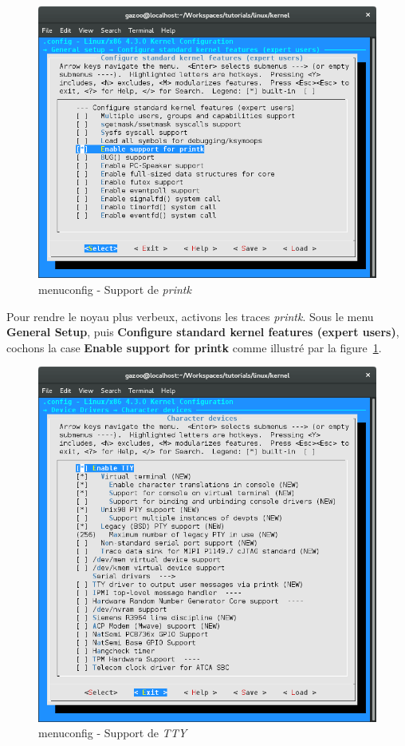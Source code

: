 \documentclass[a4paper]{article}
\begin{document}
\begin{figure}
\label{fig:menuconfig_enable_printk}
\includegraphics[scale=0.5]{../res/menuconfig-enable-printk.png}
\caption{menuconfig - Support de \textit{printk}}
\end{figure}

Pour rendre le noyau plus verbeux, activons les traces \textit{printk}. Sous le menu \textbf{General Setup}, puis \textbf{Configure standard kernel features (expert users)}, cochons la case \textbf{Enable support for printk} comme illustré par la figure~\ref{fig:menuconfig_enable_printk}.\\

\begin{figure}
\label{fig:menuconfig_enable_tty}
\includegraphics[scale=0.5]{../res/menuconfig-enable-tty.png}
\caption{menuconfig - Support de \textit{TTY}}
\end{figure}
\end{document}
